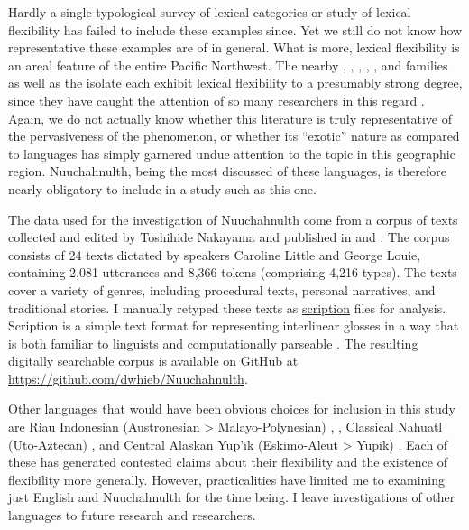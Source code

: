 Hardly a single typological survey of lexical categories or study of lexical flexibility has failed to include these examples since. Yet we still do not know how representative these examples are of  in general. What is more, lexical flexibility is an areal feature of the entire Pacific Northwest. The nearby , , , , , and  families as well as the isolate  each exhibit lexical flexibility to a presumably strong degree, since they have caught the attention of so many researchers in this regard . Again, we do not actually know whether this literature is truly representative of the pervasiveness of the phenomenon, or whether its \enquote{exotic} nature as compared to  languages has simply garnered undue attention to the topic in this geographic region. Nuuchahnulth, being the most discussed of these languages, is therefore nearly obligatory to include in a study such as this one.

The data used for the investigation of Nuuchahnulth come from a corpus of texts collected and edited by Toshihide Nakayama and published in \textcite{Little2003} and \textcite{Louie2003}. The corpus consists of 24 texts dictated by speakers Caroline Little and George Louie, containing 2,081 utterances and 8,366 tokens (comprising 4,216 types). The texts cover a variety of genres, including procedural texts, personal narratives, and traditional stories. I manually retyped these texts as \href{https://scription.digitallinguistics.io}{scription} files for analysis. Scription is a simple text format for representing interlinear glosses in a way that is both familiar to linguists and computationally parseable \parencite{Hieber2020b}. The resulting digitally searchable corpus is available on GitHub at \url{https://github.com/dwhieb/Nuuchahnulth}.

Other languages that would have been obvious choices for inclusion in this study are Riau Indonesian (Austronesian > Malayo-Polynesian) \parencite{Gil1994},  \parencites{EvansOsada2005}{HengeveldRijkhoff2005}, Classical Nahuatl (Uto-Aztecan) \parencites{Launey1994}{Launey2004}, and Central Alaskan Yup'ik (Eskimo-Aleut > Yupik) \parencites{Thalbitzer1922}{Sadock1999}{Mithun2017}. Each of these has generated contested claims about their flexibility and the existence of flexibility more generally. However, practicalities have limited me to examining just English and Nuuchahnulth for the time being. I leave investigations of other languages to future research and researchers.

